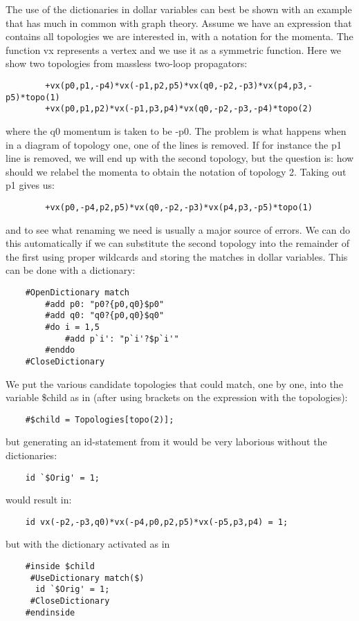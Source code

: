 The use of the dictionaries in dollar variables can best be shown with an 
example that has much in common with graph theory. Assume we have an 
expression that contains all topologies we are interested in, with a 
notation for the momenta. The function vx represents a vertex and we use it 
as a symmetric function. Here we show two topologies from massless two-loop 
propagators:
\begin{verbatim}
        +vx(p0,p1,-p4)*vx(-p1,p2,p5)*vx(q0,-p2,-p3)*vx(p4,p3,-p5)*topo(1)
        +vx(p0,p1,p2)*vx(-p1,p3,p4)*vx(q0,-p2,-p3,-p4)*topo(2)
\end{verbatim}
where the q0 momentum is taken to be -p0. The problem is what happens when 
in a diagram of topology one, one of the lines is removed. If for instance 
the p1 line is removed, we will end up with the second topology, but the 
question is: how should we relabel the momenta to obtain the notation of 
topology 2. Taking out p1 gives us:
\begin{verbatim}
        +vx(p0,-p4,p2,p5)*vx(q0,-p2,-p3)*vx(p4,p3,-p5)*topo(1)
\end{verbatim}
and to see what renaming we need is usually a major source of errors.
We can do this automatically if we can substitute the second topology into 
the remainder of the first using proper wildcards and storing the matches 
in dollar variables. This can be done with a dictionary:
\begin{verbatim}
    #OpenDictionary match
        #add p0: "p0?{p0,q0}$p0"
        #add q0: "q0?{p0,q0}$q0"
        #do i = 1,5
            #add p`i': "p`i'?$p`i'"
        #enddo
    #CloseDictionary
\end{verbatim}
We put the various candidate topologies that could match, one by one, into 
the variable \$child as in (after using brackets on the expression with the 
topologies):
\begin{verbatim}
    #$child = Topologies[topo(2)];
\end{verbatim}
but generating an id-statement from it would be very laborious without the 
dictionaries:
\begin{verbatim}
    id `$Orig' = 1;
\end{verbatim}
would result in:
\begin{verbatim}
    id vx(-p2,-p3,q0)*vx(-p4,p0,p2,p5)*vx(-p5,p3,p4) = 1;
\end{verbatim}
but with the dictionary activated as in
\begin{verbatim}
    #inside $child
     #UseDictionary match($)
      id `$Orig' = 1;
     #CloseDictionary
    #endinside
\end{verbatim}
